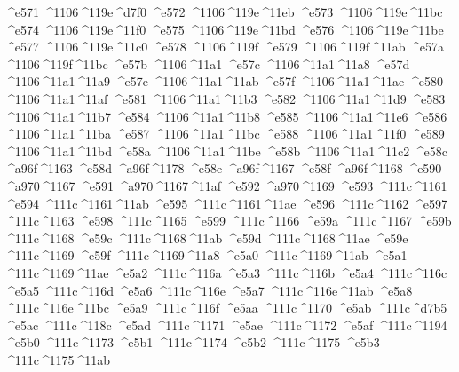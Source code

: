 \checkit ^^^^e571 ^^^^1106^^^^119e^^^^d7f0
\checkit ^^^^e572 ^^^^1106^^^^119e^^^^11eb
\checkit ^^^^e573 ^^^^1106^^^^119e^^^^11bc
\checkit ^^^^e574 ^^^^1106^^^^119e^^^^11f0
\checkit ^^^^e575 ^^^^1106^^^^119e^^^^11bd
\checkit ^^^^e576 ^^^^1106^^^^119e^^^^11be
\checkit ^^^^e577 ^^^^1106^^^^119e^^^^11c0
\checkit ^^^^e578 ^^^^1106^^^^119f
\checkit ^^^^e579 ^^^^1106^^^^119f^^^^11ab
\checkit ^^^^e57a ^^^^1106^^^^119f^^^^11bc
\checkit ^^^^e57b ^^^^1106^^^^11a1
\checkit ^^^^e57c ^^^^1106^^^^11a1^^^^11a8
\checkit ^^^^e57d ^^^^1106^^^^11a1^^^^11a9
\checkit ^^^^e57e ^^^^1106^^^^11a1^^^^11ab
\checkit ^^^^e57f ^^^^1106^^^^11a1^^^^11ae
\checkit ^^^^e580 ^^^^1106^^^^11a1^^^^11af
\checkit ^^^^e581 ^^^^1106^^^^11a1^^^^11b3
\checkit ^^^^e582 ^^^^1106^^^^11a1^^^^11d9
\checkit ^^^^e583 ^^^^1106^^^^11a1^^^^11b7
\checkit ^^^^e584 ^^^^1106^^^^11a1^^^^11b8
\checkit ^^^^e585 ^^^^1106^^^^11a1^^^^11e6
\checkit ^^^^e586 ^^^^1106^^^^11a1^^^^11ba
\checkit ^^^^e587 ^^^^1106^^^^11a1^^^^11bc
\checkit ^^^^e588 ^^^^1106^^^^11a1^^^^11f0
\checkit ^^^^e589 ^^^^1106^^^^11a1^^^^11bd
\checkit ^^^^e58a ^^^^1106^^^^11a1^^^^11be
\checkit ^^^^e58b ^^^^1106^^^^11a1^^^^11c2
\checkit ^^^^e58c ^^^^a96f^^^^1163
\checkit ^^^^e58d ^^^^a96f^^^^1178
\checkit ^^^^e58e ^^^^a96f^^^^1167
\checkit ^^^^e58f ^^^^a96f^^^^1168
\checkit ^^^^e590 ^^^^a970^^^^1167
\checkit ^^^^e591 ^^^^a970^^^^1167^^^^11af
\checkit ^^^^e592 ^^^^a970^^^^1169
\checkit ^^^^e593 ^^^^111c^^^^1161
\checkit ^^^^e594 ^^^^111c^^^^1161^^^^11ab
\checkit ^^^^e595 ^^^^111c^^^^1161^^^^11ae
\checkit ^^^^e596 ^^^^111c^^^^1162
\checkit ^^^^e597 ^^^^111c^^^^1163
\checkit ^^^^e598 ^^^^111c^^^^1165
\checkit ^^^^e599 ^^^^111c^^^^1166
\checkit ^^^^e59a ^^^^111c^^^^1167
\checkit ^^^^e59b ^^^^111c^^^^1168
\checkit ^^^^e59c ^^^^111c^^^^1168^^^^11ab
\checkit ^^^^e59d ^^^^111c^^^^1168^^^^11ae
\checkit ^^^^e59e ^^^^111c^^^^1169
\checkit ^^^^e59f ^^^^111c^^^^1169^^^^11a8
\checkit ^^^^e5a0 ^^^^111c^^^^1169^^^^11ab
\checkit ^^^^e5a1 ^^^^111c^^^^1169^^^^11ae
\checkit ^^^^e5a2 ^^^^111c^^^^116a
\checkit ^^^^e5a3 ^^^^111c^^^^116b
\checkit ^^^^e5a4 ^^^^111c^^^^116c
\checkit ^^^^e5a5 ^^^^111c^^^^116d
\checkit ^^^^e5a6 ^^^^111c^^^^116e
\checkit ^^^^e5a7 ^^^^111c^^^^116e^^^^11ab
\checkit ^^^^e5a8 ^^^^111c^^^^116e^^^^11bc
\checkit ^^^^e5a9 ^^^^111c^^^^116f
\checkit ^^^^e5aa ^^^^111c^^^^1170
\checkit ^^^^e5ab ^^^^111c^^^^d7b5
\checkit ^^^^e5ac ^^^^111c^^^^118c
\checkit ^^^^e5ad ^^^^111c^^^^1171
\checkit ^^^^e5ae ^^^^111c^^^^1172
\checkit ^^^^e5af ^^^^111c^^^^1194
\checkit ^^^^e5b0 ^^^^111c^^^^1173
\checkit ^^^^e5b1 ^^^^111c^^^^1174
\checkit ^^^^e5b2 ^^^^111c^^^^1175
\checkit ^^^^e5b3 ^^^^111c^^^^1175^^^^11ab
